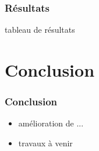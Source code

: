 \documentclass[12pt]{beamer}
\begin{document}
\begin{frame}
  \frametitle{Résultats}
  tableau de résultats
\end{frame}

\section{Conclusion}
\begin{frame}
  \frametitle{Conclusion}

  \begin{itemize}
    \item amélioration de ...
    \item travaux à venir
  \end{itemize}
\end{frame}
\end{document}
